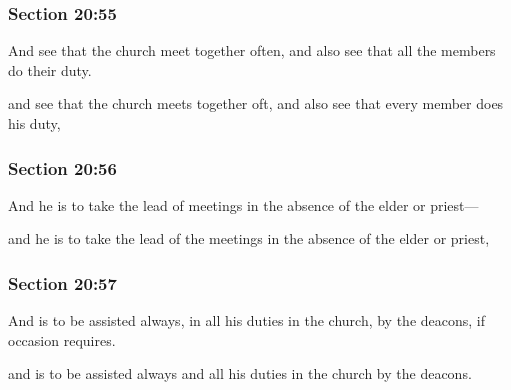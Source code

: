 	\subsubsection{Section 20:55} %
		\label{DC20-55}

		And see that the church meet together often, and also see that all the members do their duty.

		\begin{framed}
		\scriptsize
			\begin{compactdesc}
				\item[JSP] and see that the church meets together oft, and also see that every member does his duty, 
				\item[RB1] 
				\item[BC] 
			\end{compactdesc}
		\end{framed}

	\subsubsection{Section 20:56} %
		\label{DC20-56}

		And he is to take the lead of meetings in the absence of the elder or priest---

		\begin{framed}
		\scriptsize
			\begin{compactdesc}
				\item[JSP] and he is to take the lead of the meetings in the absence of the elder or priest, 
				\item[RB1] 
				\item[BC] 
			\end{compactdesc}
		\end{framed}

	\subsubsection{Section 20:57} %
		\label{DC20-57}

		And is to be assisted always, in all his duties in the church, by the deacons, if occasion requires.

		\begin{framed}
		\scriptsize
			\begin{compactdesc}
				\item[JSP] and is to be assisted always and all his duties in the church by the deacons. 
				\item[RB1] 
				\item[BC] 
			\end{compactdesc}
		\end{framed}


